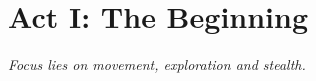 \documentclass[12pt,a4paper,openany]{book}
\begin{document}
	\chapter{Act I: The Beginning}
	\textit{Focus lies on movement, exploration and stealth.}
	\par
	
	
\end{document}
